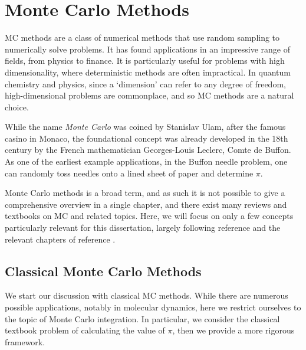 \chapter{Monte Carlo Methods}
\label{chap:qmc}


\gls{MC} methods are a class of numerical methods that use random sampling to numerically solve problems. It has found applications in an impressive range of fields, from physics to finance.\supercite{boyleOptions1977,johnsonMonte2024,kroeseWhy2014,rosenbluthMonte1955,foulkesQuantum,thijssenComputational2007}
It is particularly useful for problems with high dimensionality, where deterministic methods are often impractical. In quantum chemistry and physics, since a `dimension' can refer to any degree of freedom, high-dimensional problems are commonplace, and so \gls{MC} methods are a natural choice.

While the name \emph{Monte Carlo} was coined by Stanislav Ulam, after the famous casino in Monaco,\supercite{metropolisMonte1949,metropolisEquation1953} the foundational concept was already developed in the 18th century by the French mathematician Georges-Louis Leclerc, Comte de Buffon. As one of the earliest example applications, in the Buffon needle problem, one can randomly toss needles onto a lined sheet of paper and determine $\pi$.\supercite{leclercEssai,Histoire1735,senetaNineteenthCentury2001}

Monte Carlo methods is a broad term, and as such it is not possible to give a comprehensive overview in a single chapter, and there exist many reviews and textbooks on \gls{MC} and related topics.\supercite{allenComputer1989,binderMonte1986,binderMonte1988,newmanMonte1999,reiherHammersley1966,barKalos1988}
Here, we will focus on only a few concepts particularly relevant for this dissertation, largely following reference  and the relevant chapters of reference .

\section{Classical Monte Carlo Methods}

We start our discussion with classical \gls{MC} methods. While there are numerous possible applications, notably in molecular dynamics,\supercite{allenComputer1989} here we restrict ourselves to the topic of Monte Carlo integration. In particular, we consider the classical textbook problem of calculating the value of $\pi$, then we provide a more rigorous framework.

